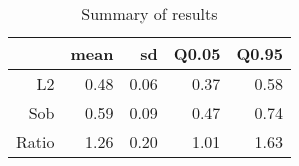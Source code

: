 \begin{table}[ht]
\centering
\caption{Summary of results} 
\label{sim-results}
\begin{tabular}{rrrrr}
  \hline
 & mean & sd & Q0.05 & Q0.95 \\ 
  \hline
L2 & 0.48 & 0.06 & 0.37 & 0.58 \\ 
  Sob & 0.59 & 0.09 & 0.47 & 0.74 \\ 
  Ratio & 1.26 & 0.20 & 1.01 & 1.63 \\ 
   \hline
\end{tabular}
\end{table}
